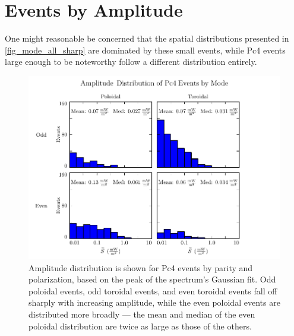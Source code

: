 



\section{Events by Amplitude}
  \label{sec_amp}

One might reasonable be concerned that the spatial distributions presented in
\cref{fig_mode_all_sharp} are dominated by these small events, while Pc4 events
large enough to be noteworthy follow a different distribution entirely. 

\begin{figure}[!htb]
  \centering
  \includegraphics[width=\textwidth]{figures/amp.pdf}
  \caption[Amplitude Distribution of Pc4 Events by Mode]{
    Amplitude distribution is shown for Pc4 events by parity and polarization,
    based on the peak of the spectrum's Gaussian fit. Odd poloidal events, odd
    toroidal events, and even toroidal events fall off sharply with increasing
    amplitude, while the even poloidal events are distributed more broadly ---
    the mean and median of the even poloidal distribution are twice as large as
    those of the others. 
  }
  \label{fig_amp}
\end{figure}

